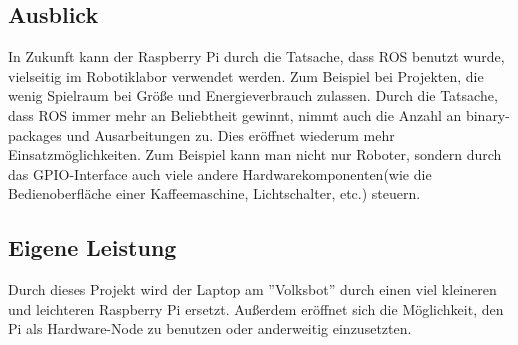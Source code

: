 \documentclass[12pt]{article}
\begin{document}
\subsection{Ausblick}

In Zukunft kann der Raspberry Pi durch die Tatsache, dass  ROS benutzt wurde, vielseitig im Robotiklabor verwendet werden. Zum Beispiel bei Projekten, die wenig Spielraum bei Größe und Energieverbrauch zulassen.
Durch die Tatsache, dass ROS immer mehr an Beliebtheit gewinnt, nimmt auch die Anzahl an binary-packages und Ausarbeitungen zu. Dies eröffnet wiederum mehr Einsatzmöglichkeiten.
Zum Beispiel kann man nicht nur Roboter, sondern durch das GPIO-Interface auch viele andere Hardwarekomponenten(wie die Bedienoberfläche einer Kaffeemaschine, Lichtschalter, etc.) steuern.  


\subsection{Eigene Leistung}

Durch dieses Projekt wird der Laptop am ''Volksbot'' durch einen viel kleineren und leichteren Raspberry Pi ersetzt. Außerdem eröffnet sich die Möglichkeit, den Pi als Hardware-Node zu benutzen oder anderweitig einzusetzten.

\pagebreak



\end{document}
